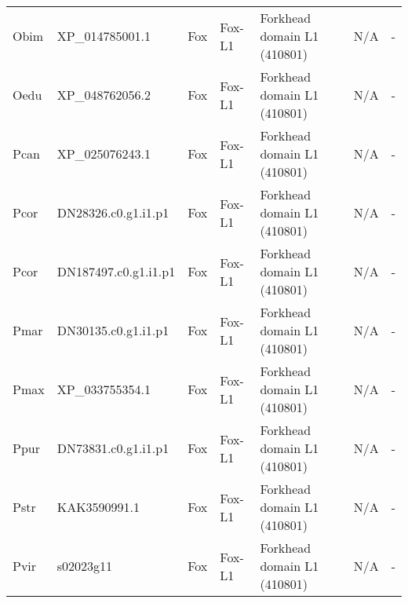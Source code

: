 \documentclass[../main.tex]{subfiles}
\begin{document}
\begin{landscape}
\begin{longtable}{lllllll}
		Obim           & XP\_014785001.1       & Fox            & Fox-L1              & Forkhead domain L1 (410801)                 & N/A                                                                    & -                    \\
		Oedu           & XP\_048762056.2       & Fox            & Fox-L1              & Forkhead domain L1 (410801)                 & N/A                                                                    & -                    \\
		Pcan           & XP\_025076243.1       & Fox            & Fox-L1              & Forkhead domain L1 (410801)                 & N/A                                                                    & -                    \\
		Pcor           & DN28326.c0.g1.i1.p1   & Fox            & Fox-L1              & Forkhead domain L1 (410801)                 & N/A                                                                    & -                    \\
		Pcor           & DN187497.c0.g1.i1.p1  & Fox            & Fox-L1              & Forkhead domain L1 (410801)                 & N/A                                                                    & -                    \\
		Pmar           & DN30135.c0.g1.i1.p1   & Fox            & Fox-L1              & Forkhead domain L1 (410801)                 & N/A                                                                    & -                    \\
		Pmax           & XP\_033755354.1       & Fox            & Fox-L1              & Forkhead domain L1 (410801)                 & N/A                                                                    & -                    \\
		Ppur           & DN73831.c0.g1.i1.p1   & Fox            & Fox-L1              & Forkhead domain L1 (410801)                 & N/A                                                                    & -                    \\
		Pstr           & KAK3590991.1          & Fox            & Fox-L1              & Forkhead domain L1 (410801)                 & N/A                                                                    & -                    \\
		Pvir           & s02023g11             & Fox            & Fox-L1              & Forkhead domain L1 (410801)                 & N/A                                                                    & -                    \\

\end{longtable}
\end{landscape}
\end{document}
